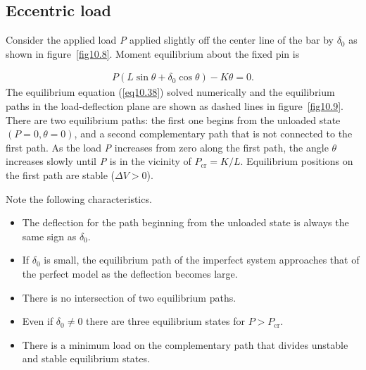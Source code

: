 \documentclass{AeroStructure-ERJohnson}
\begin{document}
\subsection{Eccentric load}\label{sec10.1.4}
Consider the applied load \textit{P} applied slightly off the center line of the bar by $\delta_{0}$ as shown in figure~\ref{fig10.8}. Moment equilibrium about the fixed pin is


\vspace*{-1.8pc}

\begin{align}\label{eq10.38}
P\left(L \sin \theta+\delta_{0} \cos \theta\right)-K \theta=0.
\end{align}
The equilibrium equation (\ref{eq10.38}) solved numerically and the equilibrium paths in the load-deflection plane are shown as dashed lines in figure~\ref{fig10.9}. There are two equilibrium paths: the first one begins from the unloaded state $({P} = 0, \theta = 0)$, and a second complementary path that is not connected to the first path. As the load \textit{P} increases from zero along the first path, the angle $\theta$ increases slowly until \textit{P} is in the vicinity of $P_{\mathrm{cr}}=K / L$. Equilibrium positions on the first path are stable ($\Delta V>0$).

Note the following characteristics.
\begin{itemize}
  \item The deflection for the path beginning from the unloaded state is always the same sign as $\delta_{0}$.
  \item If $\delta_{0}$ is small, the equilibrium path of the imperfect system approaches that of the perfect model as the deflection becomes large.
  \item There is no intersection of two equilibrium paths.
  \item Even if $\delta_{0} \neq 0$ there are three equilibrium states for $P>P_{\mathrm{cr}}$.
  \item There is a minimum load on the complementary path that divides unstable and stable equilibrium states.
\end{itemize}
\end{document}
